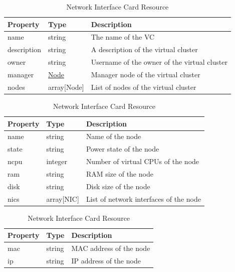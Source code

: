 \documentclass[sigconf,hyphens]{acmart}
\begin{document}
\begin{table}

\caption{Virtual Cluster Resource \cite{nist-virtual-cluster-spec}}\label{tab:vc}
\begin{tabular}{p{}p{}p{}}
\toprule
Property & Type & Description\\
\midrule
name & string & The name of the VC\\
description & string & A description of the virtual
cluster\\
owner & string & Username of the owner of the virtual
cluster\\
manager & \protect\hyperlink{node}{Node} & Manager node of the virtual
cluster\\
nodes & array{[}Node{]} & List of nodes of the virtual
cluster\\
\bottomrule
\end{tabular}

\bigskip
\caption{Node Resource \cite{nist-node-spec}}\label{tab:node}

\begin{tabular}{p{}p{}p{}}
\toprule
Property & Type & Description\\
\midrule
name & string & Name of the node\\
state & string & Power state of the node\\
ncpu & integer & Number of virtual CPUs of the node\\
ram & string & RAM size of the node\\
disk & string & Disk size of the node\\
nics & array{[}NIC{]} & List of network interfaces of the
node\\
\bottomrule
\end{tabular}

\bigskip
\caption{Network Interface Card Resource \cite{nist-nic-spec}}\label{tab:nic}

\begin{tabular}{p{}p{}p{}}
\toprule
Property & Type & Description\\
\midrule
mac & string & MAC address of the node\\
ip & string & IP address of the node\\
\bottomrule
\end{tabular}
\end{table}
\end{document}
